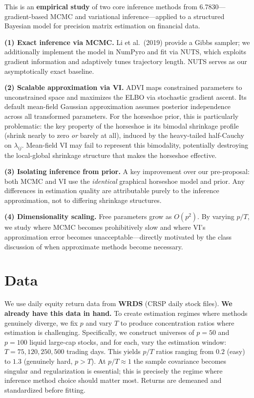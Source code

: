 \documentclass[11pt]{article}
\begin{document}
This is an \textbf{empirical study} of two core inference methods from 6.7830---gradient-based MCMC and variational inference---applied to a structured Bayesian model for precision matrix estimation on financial data.

\textbf{(1) Exact inference via MCMC.} Li et al.\ (2019) provide a Gibbs sampler; we additionally implement the model in NumPyro and fit via NUTS, which exploits gradient information and adaptively tunes trajectory length. NUTS serves as our asymptotically exact baseline.

\textbf{(2) Scalable approximation via VI.} ADVI maps constrained parameters to unconstrained space and maximizes the ELBO via stochastic gradient ascent. Its default mean-field Gaussian approximation assumes posterior independence across all transformed parameters. For the horseshoe prior, this is particularly problematic: the key property of the horseshoe is its bimodal shrinkage profile (shrink nearly to zero \emph{or} barely at all), induced by the heavy-tailed half-Cauchy on $\lambda_{ij}$. Mean-field VI may fail to represent this bimodality, potentially destroying the local-global shrinkage structure that makes the horseshoe effective.

\textbf{(3) Isolating inference from prior.} A key improvement over our pre-proposal: both MCMC and VI use the \emph{identical} graphical horseshoe model and prior. Any differences in estimation quality are attributable purely to the inference approximation, not to differing shrinkage structures.

\textbf{(4) Dimensionality scaling.} Free parameters grow as $O(p^2)$. By varying $p/T$, we study where MCMC becomes prohibitively slow and where VI's approximation error becomes unacceptable---directly motivated by the class discussion of when approximate methods become necessary.

\section{Data}

We use daily equity return data from \textbf{WRDS} (CRSP daily stock files). \textbf{We already have this data in hand.} To create estimation regimes where methods genuinely diverge, we fix $p$ and vary $T$ to produce concentration ratios where estimation is challenging. Specifically, we construct universes of $p = 50$ and $p = 100$ liquid large-cap stocks, and for each, vary the estimation window: $T = 75, 120, 250, 500$ trading days. This yields $p/T$ ratios ranging from $0.2$ (easy) to $1.3$ (genuinely hard, $p > T$). At $p/T \approx 1$ the sample covariance becomes singular and regularization is essential; this is precisely the regime where inference method choice should matter most. Returns are demeaned and standardized before fitting.
\end{document}
